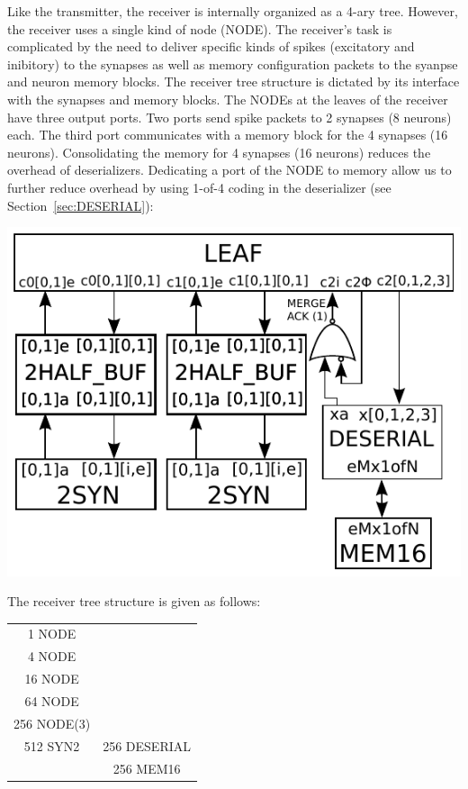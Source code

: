 \documentclass{article}
\begin{document}
Like the transmitter, the receiver is internally organized as a 4-ary tree.
However, the receiver uses a single kind of node (NODE).
The receiver's task is complicated by the need to deliver specific kinds
of spikes (excitatory and inibitory) to the synapses as well as memory 
configuration packets to the syanpse and neuron memory blocks.
The receiver tree structure is dictated by its interface with the synapses and 
memory blocks. The NODEs at the leaves of the receiver have three output ports. 
Two ports send spike packets to 2 synapses (8 neurons) each. The third port
communicates with a memory block for the 4 synapses (16 neurons).
Consolidating the memory for 4 synapses (16 neurons) reduces the overhead of 
deserializers. Dedicating a port of the NODE to memory allow us to further 
reduce overhead by using 1-of-4 coding in the deserializer 
(see Section~\ref{sec:DESERIAL}):

\begin{center}
  \includegraphics[width=.5\textwidth]{img/recv_nrn_interface_2syn2_1mem16.pdf}
\end{center}

\noindent
The receiver tree structure is given as follows:

\begin{center}
    \begin{tabular}{cc}
        1 NODE & \\
        4 NODE & \\
        16 NODE & \\
        64 NODE & \\
        256 NODE(3) & \\
        512 SYN2 & 256 DESERIAL \\
        & 256 MEM16 \\
    \end{tabular}
\end{center}
\end{document}

